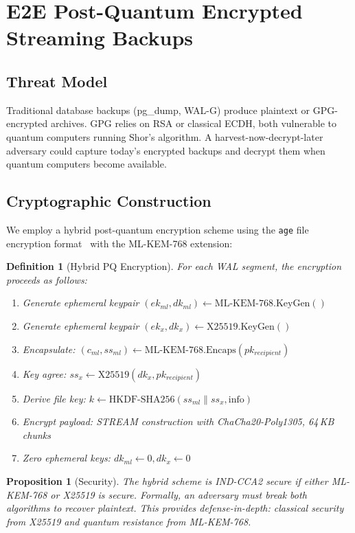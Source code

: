 \documentclass[11pt,a4paper]{article}
\newtheorem{definition}{Definition}[section]
\newtheorem{proposition}[theorem]{Proposition}
\begin{document}
\section{E2E Post-Quantum Encrypted Streaming Backups}

\subsection{Threat Model}

Traditional database backups (pg\_dump, WAL-G) produce plaintext or GPG-encrypted archives.
GPG relies on RSA or classical ECDH, both vulnerable to quantum computers running Shor's
algorithm. A harvest-now-decrypt-later adversary could capture today's encrypted backups
and decrypt them when quantum computers become available.

\subsection{Cryptographic Construction}

We employ a hybrid post-quantum encryption scheme using the \texttt{age} file encryption
format~\cite{age} with the ML-KEM-768 extension:

\begin{definition}[Hybrid PQ Encryption]
For each WAL segment, the encryption proceeds as follows:
\begin{enumerate}
  \item Generate ephemeral keypair $(ek_{ml}, dk_{ml}) \leftarrow \text{ML-KEM-768.KeyGen}()$
  \item Generate ephemeral keypair $(ek_{x}, dk_{x}) \leftarrow \text{X25519.KeyGen}()$
  \item Encapsulate: $(c_{ml}, ss_{ml}) \leftarrow \text{ML-KEM-768.Encaps}(pk_{recipient})$
  \item Key agree: $ss_{x} \leftarrow \text{X25519}(dk_{x}, pk_{recipient})$
  \item Derive file key: $k \leftarrow \text{HKDF-SHA256}(ss_{ml} \| ss_{x}, \text{info})$
  \item Encrypt payload: STREAM construction with ChaCha20-Poly1305, 64\,KB chunks
  \item Zero ephemeral keys: $dk_{ml} \leftarrow 0, dk_{x} \leftarrow 0$
\end{enumerate}
\end{definition}

\begin{proposition}[Security]
The hybrid scheme is IND-CCA2 secure if either ML-KEM-768 or X25519 is secure. Formally,
an adversary must break \emph{both} algorithms to recover plaintext. This provides
defense-in-depth: classical security from X25519 and quantum resistance from ML-KEM-768.
\end{proposition}
\end{document}
